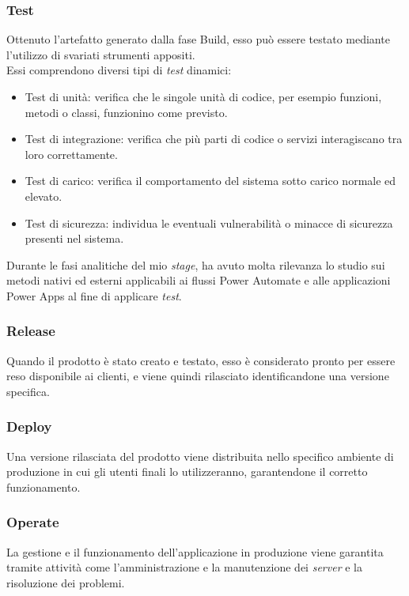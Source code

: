 \subsubsection*{Test}
Ottenuto l'artefatto generato dalla fase Build, esso può essere testato mediante l'utilizzo di svariati strumenti appositi.\\
Essi comprendono diversi tipi di \emph{test} dinamici: 
\begin{itemize}
    \item Test di unità: verifica che le singole unità di codice, per esempio funzioni, metodi o classi, funzionino come previsto.
    \item Test di integrazione: verifica che più parti di codice o servizi interagiscano tra loro correttamente.
    \item Test di carico: verifica il comportamento del sistema sotto carico normale ed elevato.
    \item Test di sicurezza: individua le eventuali vulnerabilità o minacce di sicurezza presenti nel sistema. 
\end{itemize}
Durante le fasi analitiche del mio \emph{stage}, ha avuto molta rilevanza lo studio sui metodi nativi ed esterni applicabili ai flussi Power Automate e alle applicazioni Power Apps al fine di applicare \emph{test}. 

\subsubsection*{Release}
Quando il prodotto è stato creato e testato, esso è considerato pronto per essere reso disponibile ai clienti, e viene quindi rilasciato identificandone una versione specifica.

\subsubsection*{Deploy}
Una versione rilasciata del prodotto viene distribuita nello specifico ambiente di produzione in cui gli utenti finali lo utilizzeranno, garantendone il corretto funzionamento.

\subsubsection*{Operate}
La gestione e il funzionamento dell'applicazione in produzione viene garantita tramite attività come l'amministrazione e la manutenzione dei \emph{server} e la risoluzione dei problemi. 

